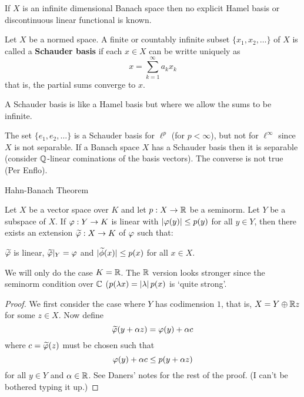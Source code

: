 \begin{rmk}
  If $X$ is an infinite dimensional Banach space then no explicit Hamel basis or discontinuous linear functional is known.
\end{rmk}

\begin{defn}
  Let $X$ be a normed space.
  A finite or countably infinite subset $\{x_1,x_2,\ldots\}$ of $X$ is called a \textbf{Schauder basis} if each $x \in X$ can be writte uniquely as
  \[x = \sum_{k=1}^\infty a_kx_k\]
  that is, the partial sums converge to $x$.
\end{defn}

\begin{rmk}
  A Schauder basis is like a Hamel basis but where we allow the sums to be infinite.
\end{rmk}

\begin{exam}
  The set $\{e_1,e_2,\ldots\}$ is a Schauder basis for $\ell^p$ (for $p<\infty$), but not for $\ell^\infty$ since $X$ is not separable.
  If a Banach space $X$ has a Schauder basis then it is separable (consider $\mathbb{Q}$-linear cominations of the basis vectors).
  The converse is not true (Per Enflo).
\end{exam}

Hahn-Banach Theorem

\begin{thm}
  Let $X$ be a vector space over $K$ and let $p: X \to \mathbb{R}$ be a seminorm.
  Let $Y$ be a subspace of $X$.
  If $\varphi:Y\to K$ is linear with $\left\lvert \varphi(y) \right\rvert\leq p(y)$ for all $y \in Y$, then there exists an extension $\widetilde{\varphi}:X\to K$ of $\varphi$ such that:
  \begin{enum}
    \io $\widetilde{\varphi}$ is linear,
    \io $\widetilde{\varphi}|_Y=\varphi$ and
    \io $|\widetilde\phi(x)|\leq p(x)$ for all $x \in X$.
  \end{enum}
  We will only do the case $K=\mathbb{R}$.
  The $\mathbb{R}$ version looks stronger since the seminorm condition over $\mathbb{C}$ ($p(\lambda x)=\left\lvert \lambda \right\rvert p(x)$ is `quite strong'.
\end{thm}

\begin{proof}
  We first consider the case where $Y$ has codimension $1$, that is, $X = Y \oplus \mathbb{R} z$ for some $z \in X$.
  Now define
  \[\widetilde {\varphi}(y+\alpha z) = \varphi(y)+\alpha c\]
  where $c = \widetilde{\varphi}(z)$ must be chosen such that
  \[\varphi(y)+\alpha c \leq p(y+\alpha z)\]
  for all $y \in Y$ and $\alpha \in \mathbb{R}$.
  See Daners' notes for the rest of the proof.
  (I can't be bothered typing it up.)
\end{proof}
